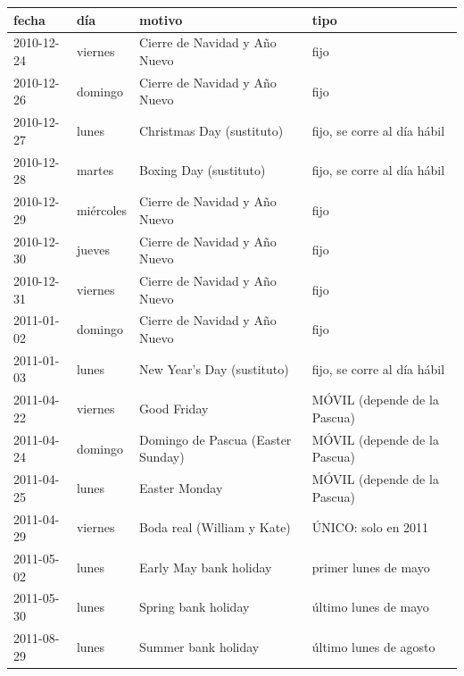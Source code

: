 \begin{tabular}{llll}
\toprule
fecha & día & motivo & tipo \\
\midrule
2010-12-24 & viernes & Cierre de Navidad y Año Nuevo & fijo \\
2010-12-26 & domingo & Cierre de Navidad y Año Nuevo & fijo \\
2010-12-27 & lunes & Christmas Day (sustituto) & fijo, se corre al día hábil \\
2010-12-28 & martes & Boxing Day (sustituto) & fijo, se corre al día hábil \\
2010-12-29 & miércoles & Cierre de Navidad y Año Nuevo & fijo \\
2010-12-30 & jueves & Cierre de Navidad y Año Nuevo & fijo \\
2010-12-31 & viernes & Cierre de Navidad y Año Nuevo & fijo \\
2011-01-02 & domingo & Cierre de Navidad y Año Nuevo & fijo \\
2011-01-03 & lunes & New Year's Day (sustituto) & fijo, se corre al día hábil \\
2011-04-22 & viernes & Good Friday & MÓVIL (depende de la Pascua) \\
2011-04-24 & domingo & Domingo de Pascua (Easter Sunday) & MÓVIL (depende de la Pascua) \\
2011-04-25 & lunes & Easter Monday & MÓVIL (depende de la Pascua) \\
2011-04-29 & viernes & Boda real (William y Kate) & ÚNICO: solo en 2011 \\
2011-05-02 & lunes & Early May bank holiday & primer lunes de mayo \\
2011-05-30 & lunes & Spring bank holiday & último lunes de mayo \\
2011-08-29 & lunes & Summer bank holiday & último lunes de agosto \\
\bottomrule
\end{tabular}